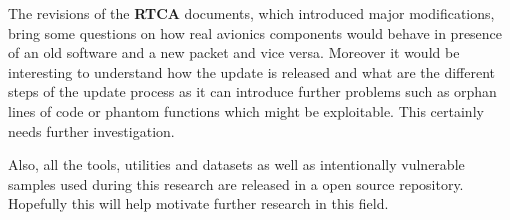 \documentclass[../main.tex]{subfiles}
\begin{document}
The revisions of the \textbf{RTCA} documents, which introduced major modifications, bring some questions on how real avionics components would behave in presence of an old software and a new packet and vice versa. Moreover it would be interesting to understand how the update is released and what are the different steps of the update process as it can introduce further problems such as orphan lines of code or phantom functions which might be exploitable. This certainly needs further investigation.

Also, all the tools, utilities and datasets as well as intentionally vulnerable samples used during this research are released in a open source repository.
Hopefully this will help motivate further research in this field.
\end{document}
